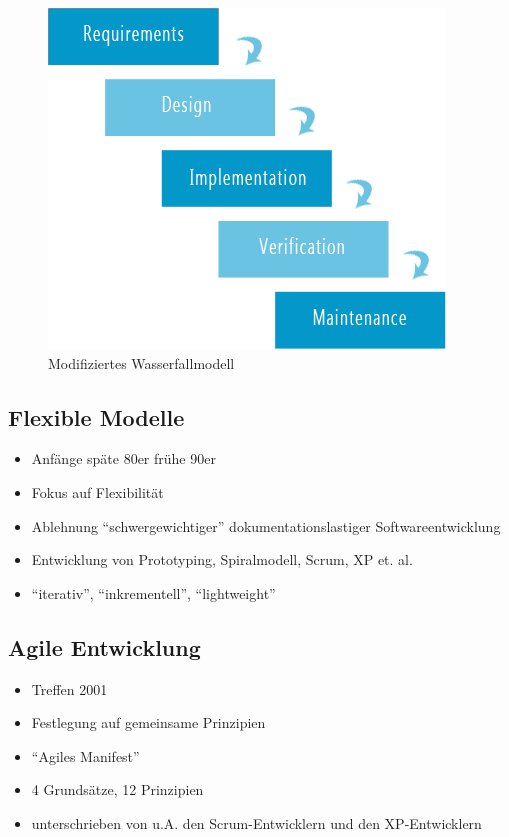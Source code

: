 \documentclass[%
	handout
]{beamer}
\begin{document}
		\begin{frame}[fragile]
			\begin{figure}
				\begin{center}
					\includegraphics[scale=.5]{../images/waterfall.png}
					\caption{Modifiziertes Wasserfallmodell}
					\label{img:waterfall}
				\end{center}
			\end{figure}
		\end{frame}
	\subsection{Flexible Modelle}
		\begin{frame}
			\begin{itemize}
				\item Anfänge späte 80er frühe 90er\pause
				\item Fokus auf Flexibilität\pause
				\item Ablehnung ``schwergewichtiger'' dokumentationslastiger Softwareentwicklung\pause
				\item Entwicklung von Prototyping, Spiralmodell, Scrum, XP et. al.\pause
				\item ``iterativ'', ``inkrementell'', ``lightweight''
			\end{itemize}
		\end{frame}
	\subsection{Agile Entwicklung}
		\begin{frame}
			\begin{itemize}
				\item Treffen 2001
				\item Festlegung auf gemeinsame Prinzipien
				\item ``Agiles Manifest''
				\item 4 Grundsätze, 12 Prinzipien
				\item unterschrieben von u.A. den Scrum-Entwicklern und den XP-Entwicklern
			\end{itemize}
		\end{frame}
		
\end{document}
